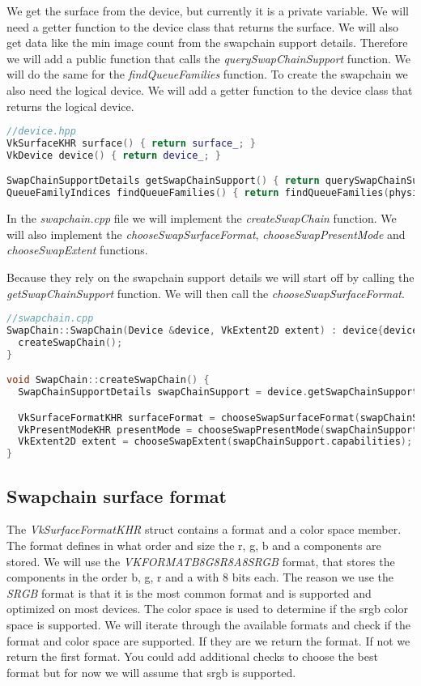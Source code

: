 \documentclass[12pt]{report} \usepackage{preamble}
\begin{document}
We get the surface from the device, but currently it is a private variable. We will
need a getter function to the device class that returns the surface. We will also get
data like the min image count from the swapchain support details. Therefore we will add
a public function that calls the \textit{querySwapChainSupport} function. We will do the same
for the \textit{findQueueFamilies} function. To create the swapchain we also need the
logical device. We will add a getter function to the device class that returns the logical
device.

\begin{lstlisting}[language=C++]
//device.hpp
VkSurfaceKHR surface() { return surface_; }
VkDevice device() { return device_; }

SwapChainSupportDetails getSwapChainSupport() { return querySwapChainSupport(device_); }
QueueFamilyIndices findQueueFamilies() { return findQueueFamilies(physicalDevice); }
\end{lstlisting}

In the \textit{swapchain.cpp} file we will implement the \textit{createSwapChain} function.
We will also implement the \textit{chooseSwapSurfaceFormat}, \textit{chooseSwapPresentMode}
and \textit{chooseSwapExtent} functions.

Because they rely on the swapchain support details we will start off by calling the
\textit{getSwapChainSupport} function. We will then call the \textit{chooseSwapSurfaceFormat}.

\begin{lstlisting}[language=C++]
//swapchain.cpp
SwapChain::SwapChain(Device &device, VkExtent2D extent) : device{device}, windowExtent{extent} {
  createSwapChain();
}

void SwapChain::createSwapChain() {
  SwapChainSupportDetails swapChainSupport = device.getSwapChainSupport();

  VkSurfaceFormatKHR surfaceFormat = chooseSwapSurfaceFormat(swapChainSupport.formats);
  VkPresentModeKHR presentMode = chooseSwapPresentMode(swapChainSupport.presentModes);
  VkExtent2D extent = chooseSwapExtent(swapChainSupport.capabilities);
}
\end{lstlisting}

\subsection{Swapchain surface format}

The \textit{VkSurfaceFormatKHR} struct contains a format and a color space member. The format
defines in what order and size the r, g, b and a components are stored. We will use the
\textit{VK\textunderscore FORMAT\textunderscore B8G8R8A8\textunderscore SRGB} format, that stores
the components in the order b, g, r and a with 8 bits each. The reason
we use the \textit{SRGB} format is that it is the most common format and is supported and optimized
on most devices. The color space is used to determine if the srgb color space is supported. We will
iterate through the available formats and check if the format and color space are supported. If they
are we return the format. If not we return the first format. You could add additional checks to
choose the best format but for now we will assume that srgb is supported.
\end{document}

